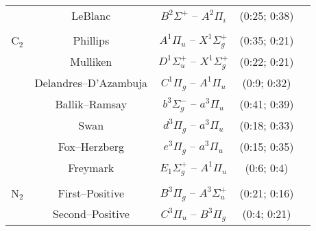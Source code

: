 \begin{center}
\begin{footnotesize}
\begin{supertabular*}{1.0\textwidth}{ccccc}
                                                & LeBlanc                                    & $B^2 \Sigma^+$ -- $A^2 \Pi_i$                                      & (0:25; 0:38)                               & \cite{BRP+2009} \\
\\
                           C$_2$        & Phillips                                      & $A^1 \Pi_u$ -- $X^1 \Sigma_g^+$                                & (0:35; 0:21)                               & \cite{BRP+2009} \\
                                               & Mulliken                                    & $D^1 \Sigma_u^+$ -- $X^1 \Sigma_g^+$                    & (0:22; 0:21)                               & \cite{BRP+2009} \\
                                               & Delandres--D'Azambuja        & $C^1 \Pi_g$ -- $A^1 \Pi_u$                                            & (0:9; 0:32)                               & \cite{BRP+2009} \\
                                               & Ballik--Ramsay                        & $b^3 \Sigma_g^-$ -- $a^3 \Pi_u$                                  & (0:41; 0:39)                               & \cite{BRP+2009} \\
                                               & Swan                                         & $d^3 \Pi_g$ -- $a^3 \Pi_u$                                              & (0:18; 0:33)                               & \cite{BRP+2009} \\
                                               & Fox--Herzberg                         & $e^3 \Pi_g$ -- $a^3 \Pi_u$                                              & (0:15; 0:35)                               & \cite{BRP+2009} \\
                                               & Freymark                                  & $E_1 \Sigma_g^+$ -- $A^1 \Pi_u$                                 & (0:6; 0:4)                                 & \cite{hyun_phd} \\
\\
                           N$_2$       & First--Positive                           & $B^3 \Pi_g$ -- $A^3 \Sigma_u^+$                                 & (0:21; 0:16)                               & \cite{CPR+2002} \\
                                              & Second--Positive                     & $C^3 \Pi_u$ -- $B^3 \Pi_g$                                             & (0:4; 0:21)                               & \cite{CPR+2002} \\

\end{supertabular*}
\end{footnotesize}
\end{center}
